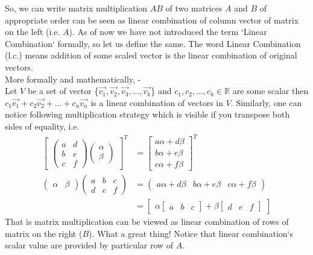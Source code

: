 \documentclass{article}
\begin{document}
So, we can write matrix multiplication $AB$ of two matrices $A$ and $B$ of appropriate order can be seen as linear combination of column vector of matrix on the left (i.e. $A$). As of now we have not introduced the term `Linear Combination` formally, so let us define the same. The word Linear Combination (l.c.) means addition of some scaled vector is the linear combination of original vectors. \\
More formally and mathematically, -\\
Let $V$ be a set of vector \{\( \vec{v_1}, \vec{v_2}, \vec{v_3}, \dots , \vec{v_k}\)\} and \(c_1, c_2, \dots,c_k \in \mathbb{R}\) are some scalar then \(c_1\vec{v_1}+ c_2\vec{v_2}+\dots +c_n\vec{v_n}\) is a linear combination of vectors in $V$. Similarly, one can notice following multiplication strategy which is visible if you transpose both sides of equality, i.e.\\
\begin{align}
    \begin{bmatrix}\begin{pmatrix}a & d \\ b & e \\ c & f \end{pmatrix}\begin{pmatrix}\alpha \\ \beta \end{pmatrix}\end{bmatrix}^T &= \begin{bmatrix}a\alpha + d\beta \\b\alpha + e\beta \\c\alpha + f\beta  \end{bmatrix}^T\nonumber\\
    \begin{pmatrix}\alpha & \beta\end{pmatrix}\begin{pmatrix}a & b & c \\ d & e & f \end{pmatrix} &= \begin{pmatrix}a\alpha + d\beta & b\alpha + e\beta & c\alpha + f\beta \end{pmatrix}\nonumber\\
    &= \begin{bmatrix}\alpha\begin{bmatrix}a & b & c\end{bmatrix} + \beta \begin{bmatrix}d & e & f\end{bmatrix}\end{bmatrix}\nonumber
\end{align}
That is matrix multiplication can be viewed as linear combination of rows of matrix on the right ($B$). What a great thing! Notice that linear combination`s scalar value are provided by particular row of $A$.\\
\end{document}
